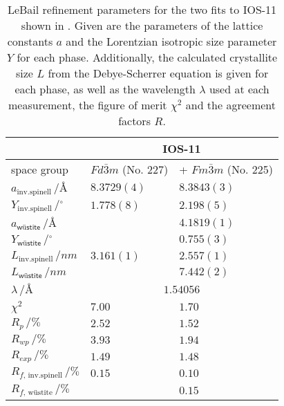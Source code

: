 \documentclass[\main/dresen_thesis.tex]{subfiles}
\begin{document}
  \begin{table}[ht]
    \centering
    \caption{\label{tab:looselyPackedNS:nanoparticle:discussion:xrdLeBail}LeBail refinement parameters for the two fits to IOS-11 shown in . Given are the parameters of the lattice constants $a$ and the Lorentzian isotropic size parameter $Y$ for each phase. Additionally, the calculated crystallite size $L$ from the Debye-Scherrer equation is given for each phase, as well as the wavelength $\lambda$ used at each measurement, the figure of merit $\chi^2$ and the agreement factors $R$.}
    \begin{tabular}{ l | l | l }
      \hline
      \rule{0pt}{2ex} & \multicolumn{2}{c}{\textbf{IOS-11}}\\
      \hline
      \hline
      \rule{0pt}{2ex}space group & $Fd\bar{3}m$ (No. 227) & + $Fm\bar{3}m$ (No. 225)\\
      \hline
      \rule{0pt}{2ex} $a_\mathrm{inv. spinell} \,/ \unit{\angstrom}$         & $8.3729(4)$ & $8.3843(3)$  \\
      \rule{0pt}{2ex} $Y_\mathrm{inv. spinell} \,/ \unit{^\circ}$            & $1.778(8)$  & $2.198(5)$   \\
      \rule{0pt}{2ex} $a_\textsf{w\"ustite}     \,/ \unit{\angstrom}$        &             & $4.1819(1)$  \\
      \rule{0pt}{2ex} $Y_\textsf{w\"ustite}     \,/ \unit{^\circ}$           &             & $0.755(3)$   \\
      \hline
      \rule{0pt}{2ex} $L_\mathrm{inv. spinell} \,/ \unit{nm}$                & $3.161(1)$  & $2.557(1)$ \\
      \rule{0pt}{2ex} $L_\textsf{w\"ustite}      \,/ \unit{nm}$              &             & $7.442(2)$ \\
      \hline
      \rule{0pt}{2ex} $\lambda \,/ \unit{\angstrom}$                         & \multicolumn{2}{c}{$1.54056$}\\
      \hline
      \rule{0pt}{2ex} $\chi^2$                                               & $7.00$      & $1.70$ \\
      \rule{0pt}{2ex} $R_p \,/ \unit{\%}$                                    & $2.52$      & $1.52$ \\
      \rule{0pt}{2ex} $R_{wp} \,/ \unit{\%}$                                 & $3.93$      & $1.94$ \\
      \rule{0pt}{2ex} $R_{exp} \,/ \unit{\%}$                                & $1.49$      & $1.48$ \\
      \rule{0pt}{2ex} $R_{f, \, \mathrm{inv. spinell}} \,/ \unit{\%}$        & $0.15$      & $0.10$ \\
      \rule{0pt}{2ex} $R_{f, \, \text{w\"ustite}} \,/ \unit{\%}$             &             & $0.15$ \\
      \hline
    \end{tabular}
  \end{table}
\end{document}
